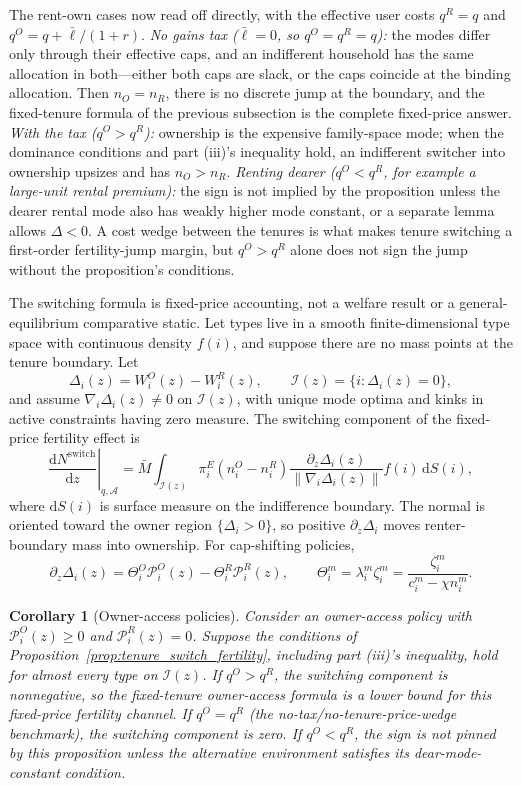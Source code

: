 \documentclass[11pt]{article}
\newtheorem{corollary}{Corollary}
\newcommand{\dd}{\mathrm d}
\newcommand{\1}{\mathbf 1}
\begin{document}
The rent-own cases now read off directly, with the effective user costs $q^R=q$ and $q^O=q+\bar\ell/(1+r)$. \emph{No gains tax ($\bar\ell=0$, so $q^O=q^R=q$):} the modes differ only through their effective caps, and an indifferent household has the same allocation in both---either both caps are slack, or the caps coincide at the binding allocation. Then $n_O=n_R$, there is no discrete jump at the boundary, and the fixed-tenure formula of the previous subsection is the complete fixed-price answer. \emph{With the tax ($q^O>q^R$):} ownership is the expensive family-space mode; when the dominance conditions and part (iii)'s inequality hold, an indifferent switcher into ownership upsizes and has $n_O>n_R$. \emph{Renting dearer ($q^O<q^R$, for example a large-unit rental premium):} the sign is not implied by the proposition unless the dearer rental mode also has weakly higher mode constant, or a separate lemma allows $\Delta<0$. A cost wedge between the tenures is what makes tenure switching a first-order fertility-jump margin, but $q^O>q^R$ alone does not sign the jump without the proposition's conditions.

The switching formula is fixed-price accounting, not a welfare result or a general-equilibrium comparative static. Let types live in a smooth finite-dimensional type space with continuous density $f(i)$, and suppose there are no mass points at the tenure boundary. Let
\[
\Delta_i(z)=W_i^O(z)-W_i^R(z),
\qquad
\mathcal I(z)=\{i:\Delta_i(z)=0\},
\]
and assume $\nabla_i\Delta_i(z)\ne0$ on $\mathcal I(z)$, with unique mode optima and kinks in active constraints having zero measure. The switching component of the fixed-price fertility effect is
\[
\left.\frac{\dd N^{\mathrm{switch}}}{\dd z}\right|_{q,\mathcal A}
=
\bar M
\int_{\mathcal I(z)}
\pi_i^E
\left(n_i^O-n_i^R\right)
\frac{\partial_z\Delta_i(z)}
{\|\nabla_i\Delta_i(z)\|}
f(i)\,\dd S(i),
\]
where $\dd S(i)$ is surface measure on the indifference boundary. The normal is oriented toward the owner region $\{\Delta_i>0\}$, so positive $\partial_z\Delta_i$ moves renter-boundary mass into ownership.
For cap-shifting policies,
\[
\partial_z\Delta_i(z)
=
\Theta_i^O \mathcal P_i^O(z)-\Theta_i^R \mathcal P_i^R(z),
\qquad
\Theta_i^m=\lambda_i^m\zeta_i^m=\frac{\zeta_i^m}{c_i^m-\chi n_i^m}.
\]

\begin{corollary}[Owner-access policies]
\label{cor:switch_owner_access}
Consider an owner-access policy with $\mathcal P_i^O(z)\ge0$ and $\mathcal P_i^R(z)=0$. Suppose the conditions of Proposition~\ref{prop:tenure_switch_fertility}, including part (iii)'s inequality, hold for almost every type on $\mathcal I(z)$. If $q^O>q^R$, the switching component is nonnegative, so the fixed-tenure owner-access formula is a lower bound for this fixed-price fertility channel. If $q^O=q^R$ (the no-tax/no-tenure-price-wedge benchmark), the switching component is zero. If $q^O<q^R$, the sign is not pinned by this proposition unless the alternative environment satisfies its dear-mode-constant condition.
\end{corollary}
\end{document}
